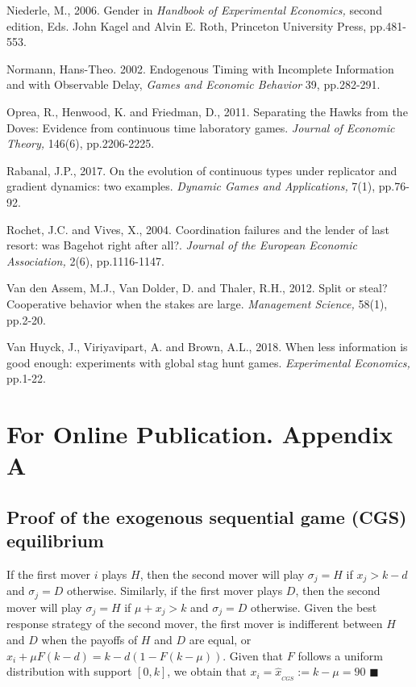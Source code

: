 \documentclass[11pt, letterpaper]{article}
\theoremstyle{plain}
\begin{document}
\begin{thebibliography}{10}
\bibitem{} Niederle, M., 2006. Gender in \textit{Handbook of Experimental Economics,} second edition, Eds. John Kagel and Alvin E. Roth, Princeton University Press, pp.481-553.

\bibitem{} Normann, Hans-Theo. 2002. Endogenous Timing with Incomplete Information and with Observable Delay, \textit{Games and Economic Behavior} 39, pp.282-291.

\bibitem{} Oprea, R., Henwood, K. and Friedman, D., 2011. Separating the Hawks from the Doves: Evidence from continuous time laboratory games. \textit{Journal of Economic Theory,} 146(6), pp.2206-2225.

\bibitem{} Rabanal, J.P., 2017. On the evolution of continuous types under replicator and gradient dynamics: two examples. \textit{Dynamic Games and Applications,} 7(1), pp.76-92.

\bibitem{} Rochet, J.C. and Vives, X., 2004. Coordination failures and the lender of last resort: was Bagehot right after all?. \textit{Journal of the European Economic Association,} 2(6), pp.1116-1147.

\bibitem{} Van den Assem, M.J., Van Dolder, D. and Thaler, R.H., 2012. Split or steal? Cooperative behavior when the stakes are large. \textit{Management Science,} 58(1), pp.2-20.

\bibitem{} Van Huyck, J., Viriyavipart, A. and Brown, A.L., 2018. When less information is good enough: experiments with global stag hunt games. \textit{Experimental Economics,} pp.1-22.


\end{thebibliography}

\newpage
\section*{For Online Publication. Appendix A}

\subsection*{Proof of the exogenous sequential game (CGS) equilibrium}

If the first mover $i$ plays $H$, then the second mover will play $\sigma_j= H$ if $x_j> k-d$ and $\sigma_j= D$ otherwise. Similarly, if the first mover plays $D$, then the second mover will play $\sigma_j= H$ if $\mu+x_j> k$ and  $\sigma_j= D$ otherwise. Given the best response strategy of the second mover, the first mover is indifferent between $H$ and $D$ when the payoffs of $H$ and $D$ are equal, or $x_i + \mu F(k-d) = k - d(1-F(k-\mu))$. Given that $F$ follows a uniform distribution with support $[0,k]$, we obtain that $x_i=\hat{x}_{_{CGS}}:= k-\mu=90$ $\blacksquare$
\end{document}

